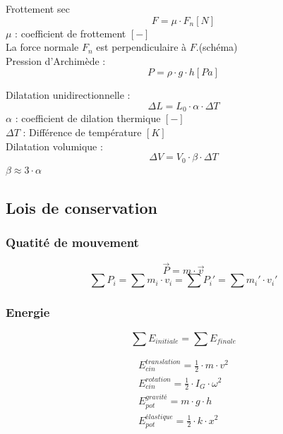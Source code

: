 	Frottement sec
	\begin{equation}
	F=\mu \cdot F_n [N]
	\end{equation}
	$\mu$ : coefficient de frottement $[-]$\\
	La force normale $F_n$ est perpendiculaire à $F$.(schéma)\\
	
	
	Pression d'Archimède :
	\begin{equation}
	P=\rho \cdot g \cdot h [Pa]
	\end{equation}
	
	Dilatation unidirectionnelle :
	\begin{equation}
	\Delta L=L_0 \cdot \alpha  \cdot \Delta T
	\end{equation}
	$\alpha$ : coefficient de dilation thermique $[-]$\\
	$\Delta T$ : Différence de température $[K]$\\
	
	Dilatation volumique : 
	\begin{equation}
	\Delta V=V_0 \cdot \beta \cdot \Delta T
	\end{equation}
	$\beta \approx 3\cdot \alpha$
	
	\subsection{Lois de conservation}
	\subsubsection{Quatité de mouvement}
	\begin{equation}
	\vec{P}=m \cdot \vec{v}
	\end{equation}
	\begin{equation}
	\sum P_{i}=\sum m_i \cdot v_i= \sum P_i '=\sum m_i ' \cdot v_i '
	\end{equation}
	\subsubsection{Energie}
	\begin{equation}
	\sum E_{initiale}=\sum E_{finale}
	\end{equation}
	
	\begin{eqnarray}
	E_{cin}^{translation}=\frac{1}{2} \cdot m \cdot v^2\\
	E_{cin}^{rotation}=\frac{1}{2} \cdot I_G \cdot \omega^2\\
	E_{pot}^{gravité}=m \cdot g \cdot h\\
	E_{pot}^{élastique}=\frac{1}{2} \cdot k \cdot x^2
	\end{eqnarray}
	
